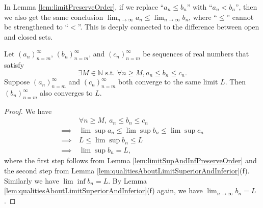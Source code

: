\begin{rem}
  In Lemma \ref{lem:limitPreserveOrder}, if we
  replace ``$a_{n}\le b_{n}$'' with ``$a_{n}<b_{n}$'',
  then we also get the same conclusion
  $\lim_{n\rightarrow \infty} a_n\le \lim_{n\rightarrow  \infty} b_n$, 
  where ``$\le$'' cannot be strengthened to ``$<$''.
  This is deeply connected to the difference between
  open and closed sets.
\end{rem}


\begin{thm}
  \label{thm:squeezeTest}
  Let $(a_n)_{n=m}^{\infty}$, $(b_n)_{n=m}^{\infty}$,
  and $(c_n)_{n=m}^{\infty}$ be sequences of real numbers
  that satisfy
  \begin{displaymath}
    \exists M\in \mathbb{N} \text{ s.t. }
    \forall n\ge M, a_n\le b_n \le c_n.
  \end{displaymath}
  Suppose $(a_n)_{n=m}^{\infty}$ and $(c_n)_{n=m}^{\infty}$
  both converge to the same limit $L$.
  Then $(b_n)_{n=m}^{\infty}$ also converges to $L$.
\end{thm}
\begin{proof}
  We have
  \begin{align*}
    &\ \forall n\ge M,\ a_{n} \le b_{n}\le c_{n}
    \\ \implies
    &\ \lim\sup a_{n}\le \lim\sup b_{n}\le \lim\sup c_{n}
    \\ \implies
    &\ L\le \lim\sup b_{n}\le L
    \\ \implies
    &\ \lim\sup b_{n} =L,
  \end{align*}
  where the first step follows from
  Lemma \ref{lem:limitSupAndInfPreserveOrder} and the second step from
  Lemma \ref{lem:qualitiesAboutLimitSuperiorAndInferior}(f).
  Similarly we have $\lim\inf b_{n}=L.$ By Lemma
  \ref{lem:qualitiesAboutLimitSuperiorAndInferior}(f) again,
  we have $\lim_{n\rightarrow \infty}b_{n}=L$.
\end{proof}



